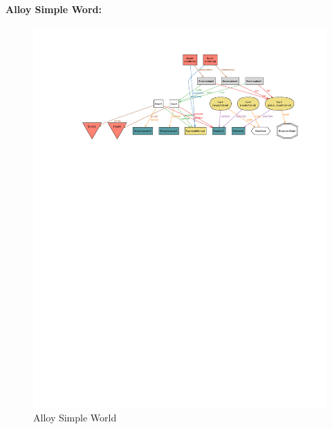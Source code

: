 \paragraph{Alloy Simple Word:}
\begin{figure}[p]
   \begin{center}
    \includegraphics[height=\textheight,angle=90]{Resources/SimpleWorld.pdf}
    \caption{Alloy Simple World}
   \end{center}
    \label{fig:simpleWorld}
\end{figure}
